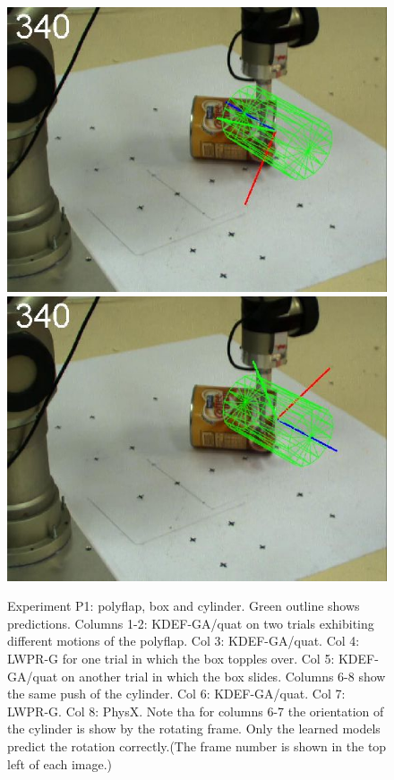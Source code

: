 \begin{figure}[htbp]
{\includegraphics[width=\imgAXwid]{images/A3_LWPR1_39_5}
\includegraphics[width=\imgAXwid]{images/A3_physx_39_5}
}
\caption {Experiment P1: polyflap, box and cylinder. Green outline shows
  predictions. Columns 1-2: KDEF-GA/quat on two trials exhibiting
  different motions of the polyflap. Col 3: KDEF-GA/quat. Col 4: LWPR-G for one trial in
  which the box topples over. Col 5: KDEF-GA/quat on another trial in
  which the box slides. Columns 6-8 show the same push of the
  cylinder. Col 6: KDEF-GA/quat. Col 7: LWPR-G. Col 8: PhysX. Note tha
  for columns 6-7 the orientation of the cylinder is show by the
  rotating frame. Only the learned models predict the rotation
  correctly.(The
  frame number is shown in the top left of each image.)  }
\label{fig:ExperimentL2}
\end{figure}

